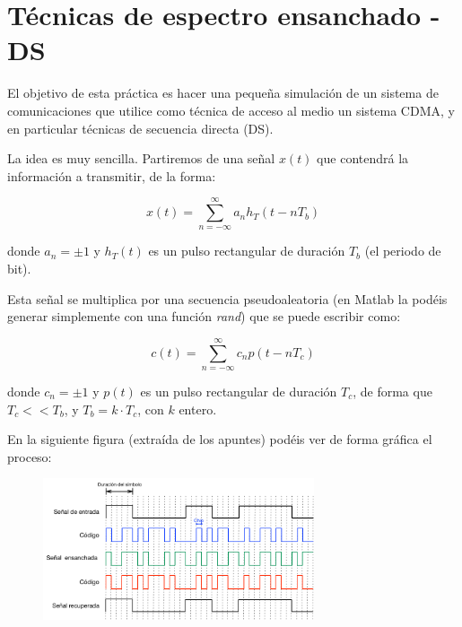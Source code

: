 \documentclass[es,practica]{uah}
\begin{document}

\maketitle

\section{Técnicas de espectro ensanchado - DS}

El objetivo de esta práctica es hacer una pequeña simulación de un sistema de comunicaciones que utilice como técnica de acceso al medio un sistema CDMA, y en particular técnicas de secuencia directa (DS). 

La idea es muy sencilla. Partiremos de una señal $x(t)$ que contendrá la información a transmitir, de la forma:

\begin{equation}
	x(t) = \sum_{n=-\infty}^{\infty} a_n h_T(t - nT_b)
\end{equation}

donde $a_n = \pm 1$ y $h_T(t)$ es un pulso rectangular de duración $T_b$ (el periodo de bit).

Esta señal se multiplica por una secuencia pseudoaleatoria (en Matlab la podéis generar simplemente con una función \emph{rand}) que se puede escribir como:

\begin{equation}
	c(t) = \sum_{n=-\infty}^{\infty} c_n p(t - nT_c)
\end{equation}

donde $c_n=\pm 1$ y $p(t)$ es un pulso rectangular de duración $T_c$, de forma que $T_c << T_b$, y $T_b = k\cdot T_c$, con $k$ entero. 

En la siguiente figura (extraída de los apuntes) podéis ver de forma gráfica el proceso: 

\begin{figure}[h!]
	\centering\includegraphics[width=8cm]{../Apuntes/Figuras/DS-CDMA}
\end{figure}
\end{document}

